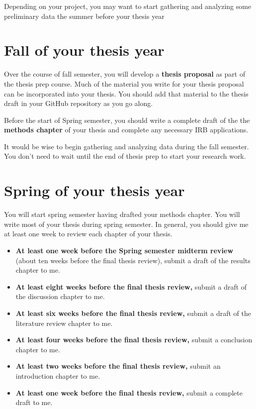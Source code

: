 \documentclass[]{tufte-book}
\begin{document}
Depending on your project, you may want to start gathering and analyzing some preliminary data the summer before your thesis year

\hypertarget{fall-of-your-thesis-year}{%
\section{Fall of your thesis year}\label{fall-of-your-thesis-year}}

Over the course of fall semester, you will develop a \textbf{thesis proposal} as part of the thesis prep course. Much of the material you write for your thesis proposal can be incorporated into your thesis. You should add that material to the thesis draft in your GitHub repository as you go along.

Before the start of Spring semester, you should write a complete draft of the the \textbf{methods chapter} of your thesis and complete any necessary IRB applications.

It would be wise to begin gathering and analyzing data during the fall semester. You don't need to wait until the end of thesis prep to start your research work.

\hypertarget{spring-of-your-thesis-year}{%
\section{Spring of your thesis year}\label{spring-of-your-thesis-year}}

You will start spring semester having drafted your methods chapter. You will write most of your thesis during spring semester. In general, you should give me at least one week to review each chapter of your thesis.

\begin{itemize}
\item
  \textbf{At least one week before the Spring semester midterm review} (about ten weeks before the final thesis review), submit a draft of the results chapter to me.
\item
  \textbf{At least eight weeks before the final thesis review,} submit a draft of the discussion chapter to me.
\item
  \textbf{At least six weeks before the final thesis review,} submit a draft of the literature review chapter to me.
\item
  \textbf{At least four weeks before the final thesis review,} submit a conclusion chapter to me.
\item
  \textbf{At least two weeks before the final thesis review,} submit an introduction chapter to me.
\item
  \textbf{At least one week before the final thesis review,} submit a complete draft to me.
\end{itemize}


\end{document}
